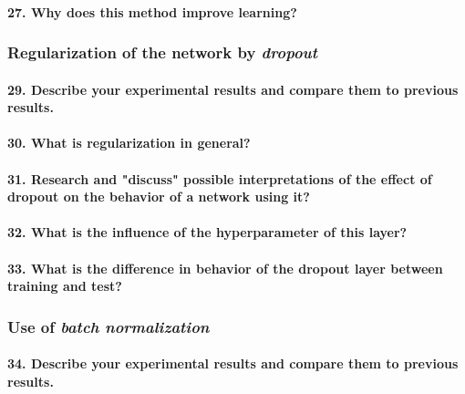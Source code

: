 \documentclass{article}
\theoremstyle{plain}%
\theoremstyle{definition}
\theoremstyle{remark}
\begin{document}
\paragraph{27. Why does this method improve learning?}


\subsubsection*{Regularization of the network by \textit{dropout}}
\paragraph{29. Describe your experimental results and compare them to previous results.}

\paragraph{30. What is regularization in general?}

\paragraph{31. Research and "discuss" possible interpretations of the effect of dropout on the behavior of a network using it?}

\paragraph{32. What is the influence of the hyperparameter of this layer?}

\paragraph{33. What is the difference in behavior of the dropout layer between training and test?}

\subsubsection{Use of \textit{batch normalization}}

\paragraph{34. Describe your experimental results and compare them to previous results.}
\end{document}
